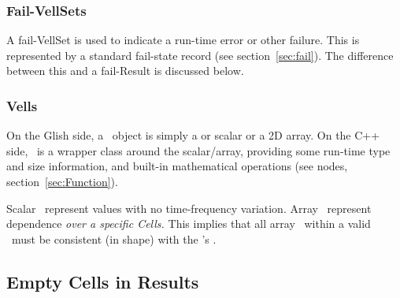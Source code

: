  \subsubsection{Fail-VellSets}

  A fail-VellSet is used to indicate a run-time error or other failure. This
  is represented by a standard fail-state record (see section~\ref{sec:fail}).
  The difference between this and a fail-Result is discussed below.

\subsubsection{Vells}

  On the Glish side, a \Vells\ object is simply a  or 
  scalar or a 2D array. On the C++ side, \Vells\ is a wrapper class around the
  scalar/array, providing some run-time type and size information, and built-in
  mathematical operations (see  nodes, section~\ref{sec:Function}).

  Scalar \Vells\ represent values with no time-frequency variation. Array
  \Vells\ represent dependence {\em over a specific Cells.} This implies that
  all array \Vells\ within a valid \Result\ must be consistent (in shape) with
  the \Result's \Cells.

\subsection{Empty Cells in Results}
  \label{sec:result-empty-cells} 
  
